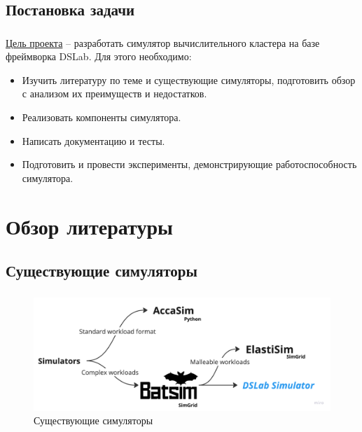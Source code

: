 \documentclass[t]{beamer}  %
\begin{document}
	\subsection{Постановка задачи}
	\begin{frame}[fragile]
		\frametitle{\insertsection} 
		\framesubtitle{\insertsubsection}
		\vspace{0.5cm}
		\underline{Цель проекта} -- разработать симулятор вычислительного кластера на базе фреймворка DSLab. Для этого необходимо:
		\begin{itemize}
			\item Изучить литературу по теме и существующие симуляторы, подготовить обзор с анализом
			их преимуществ и недостатков.
			\item Реализовать компоненты симулятора.
			\item Написать документацию и тесты.
			\item Подготовить и провести эксперименты, демонстрирующие работоспособность симулятора.
		\end{itemize}
	\end{frame}






	\section{Обзор литературы}
	\subsection{Существующие симуляторы}
	\begin{frame}
		\frametitle{\insertsection} 
		\framesubtitle{\insertsubsection}

		\begin{figure}[H]
			\hspace{-1.1cm}
			\centering
			\includegraphics[width=1.1\linewidth]{images/simulators}
			\vspace{0.2cm}
			\caption*{Существующие симуляторы}
		\end{figure}
	\end{frame}
\end{document}

